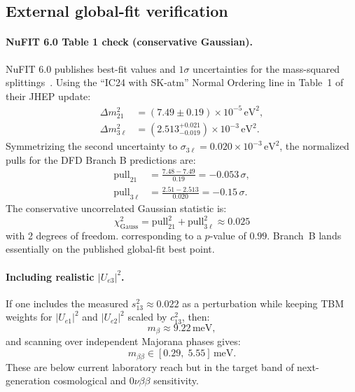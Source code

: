 \subsection{External global-fit verification}\label{app:nu-verification}

\paragraph{NuFIT 6.0 Table 1 check (conservative Gaussian).}
NuFIT 6.0 publishes best-fit values and $1\sigma$ uncertainties for the mass-squared 
splittings~\cite{nufit60}. Using the ``IC24 with SK-atm'' Normal Ordering line in Table~1 of their 
JHEP update:
\begin{align}
\Delta m^2_{21} &= (7.49\pm0.19)\times10^{-5}\,\mathrm{eV}^2, \\
\Delta m^2_{3\ell} &= (2.513^{+0.021}_{-0.019})\times10^{-3}\,\mathrm{eV}^2.
\end{align}
Symmetrizing the second uncertainty to $\sigma_{3\ell}=0.020\times10^{-3}\,\mathrm{eV}^2$, 
the normalized pulls for the DFD Branch B predictions are:
\begin{align}
\mathrm{pull}_{21} &= \frac{7.48-7.49}{0.19} = -0.053\,\sigma, \\
\mathrm{pull}_{3\ell} &= \frac{2.51-2.513}{0.020} = -0.15\,\sigma.
\end{align}
The conservative uncorrelated Gaussian statistic is:
\begin{equation}
\boxed{\chi^2_{\mathrm{Gauss}} = \mathrm{pull}_{21}^2+\mathrm{pull}_{3\ell}^2 \approx 0.025}
\end{equation}
with 2 degrees of freedom.
corresponding to a $p$-value of $0.99$. Branch~B lands essentially on the published 
global-fit best point.

\paragraph{Including realistic $|U_{e3}|^2$.}
If one includes the measured $s_{13}^2\approx 0.022$ as a perturbation while keeping 
TBM weights for $|U_{e1}|^2$ and $|U_{e2}|^2$ scaled by $c_{13}^2$, then:
\begin{equation}
m_\beta \approx 9.22\,\mathrm{meV},
\end{equation}
and scanning over independent Majorana phases gives:
\begin{equation}
m_{\beta\beta} \in [0.29,\;5.55]\,\mathrm{meV}.
\end{equation}
These are below current laboratory reach but in the target band of next-generation 
cosmological and $0\nu\beta\beta$ sensitivity.

